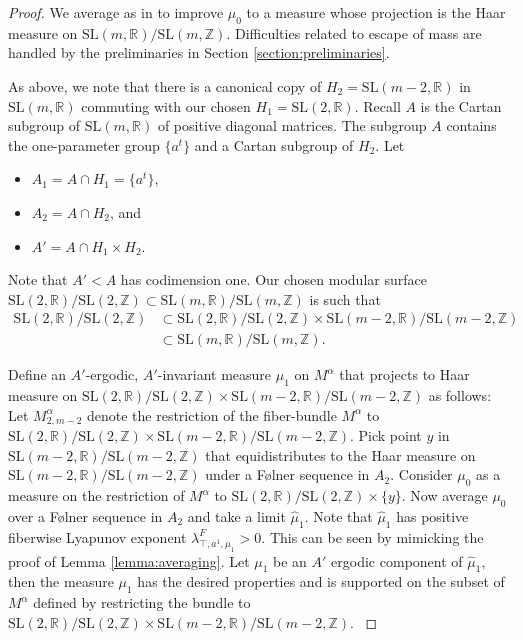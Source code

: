 \documentclass[10pt,reqno]{amsart}
\theoremstyle{Theorem}
\theoremstyle{definition}
\theoremstyle{remark}
\newcommand{\note}[1]{\marginpar{{\color{red}\footnotesize \begin{spacing}{1}#1\end{spacing}}}}
\newcommand{\noted}[1]{\marginpar{{\color{blue}\footnotesize \begin{spacing}{1}#1\end{spacing}}}}
\newcommand{\R}{\mathbb {R}}
\newcommand{\Z}{\mathbb {Z}}
\newcommand{\Sl}{\mathrm{SL}}
\def\Folner{F{\o}lner }
\def\blue{}
\begin{document}
\begin{proof}
We average as in \cite{BFH} to improve $\mu_0$ to a measure whose projection is the Haar measure on  $\Sl(m, \R)/\Sl(m,\Z)$.  Difficulties related to escape of mass are   handled by the   preliminaries in Section \ref{section:preliminaries}.

 As above, we note that there is a canonical copy of $H_2 = \Sl(m-2, \R)$ in $\Sl(m,\R)$ commuting with our chosen $H_1= \Sl(2,\R)$. {\blue Recall $A$ is the Cartan subgroup of $\Sl(m,\R)$ of positive diagonal matrices.  %
 The subgroup $A$ contains the one-parameter  group $\{a^t\}$ and a Cartan subgroup of $H_2$.} Let
 \begin{itemize}\item $A_1 = A \cap H_1 = \{a^t\}$,\item  $A_2 = A \cap H_2$, and \item $A' = A \cap H_1 \times H_2$. \end{itemize}Note that $A' <A$ has codimension one.  Our chosen modular surface $\Sl(2,\R)/\Sl(2,\Z) \subset \Sl(m,\R)/\Sl(m,\Z)$  is such that \begin{align*}\Sl(2,\R)/\Sl(2,\Z) &\subset \Sl(2,\R)/\Sl(2,\Z) \times \Sl(m-2 ,\R)/\Sl(m-2,\Z)\\& \subset \Sl(m,\R)/\Sl(m,\Z).\end{align*}

 {\blue Define an $A'$-ergodic,  $A'$-invariant  measure $\mu_1$ on $M^{\alpha}$ that projects to Haar measure on $\Sl(2,\R)/\Sl(2,\Z) \times \Sl(m-2 ,\R)/\Sl(m-2,\Z)$ as follows: Let $M^{\alpha}_{2,m-2}$ denote the  restriction of the fiber-bundle  $M^{\alpha}$ to $\Sl(2, \R)/\Sl(2,\Z) \times \Sl(m-2,\R)/\Sl(m-2, \Z)$.  Pick point $y$ in $\Sl(m-2,\R)/\Sl(m-2, \Z)$ that equidistributes to the Haar measure on $\Sl(m-2,\R)/\Sl(m-2, \Z)$ under a \Folner sequence in $A_2$.  Consider $\mu_0$ as a measure on the restriction of $M^{\alpha}$ to $\Sl(2, \R)/\Sl(2,\Z) \times \{y\}$.  Now average $\mu_0$ over a \Folner   sequence  in $A_2$ and take a limit $\hat \mu_1$.  Note that  $\hat \mu_1$ has positive fiberwise Lyapunov exponent  $ \lambda_{\top, a^1,\mu_1}^F>0$. This can be seen by  mimicking the proof of   Lemma \ref{lemma:averaging}. Let $\mu_1$ be an $A'$ ergodic component of $\hat \mu_1$, then the measure $\mu_1$ has the desired properties and is  supported on the subset of $M^{\alpha}$ defined by restricting the bundle to $\Sl(2,\R)/\Sl(2,\Z) \times \Sl(m-2 ,\R)/\Sl(m-2,\Z)$.
}



\end{proof}
\end{document}
